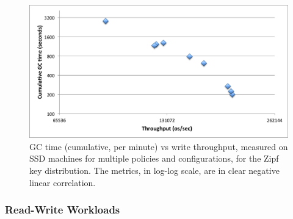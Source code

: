 \begin{figure}[htb]
\includegraphics[width=\figw]{Figs/gc-throughput-log2.png}
\caption{GC time (cumulative, per minute) vs write throughput, measured on SSD machines 
for multiple \sys\/ policies and configurations, for the Zipf  key distribution. The metrics, in log-log scale, 
are in clear negative linear correlation. 
}
\label{fig:gc-throughput-log2}
\end{figure}

\subsubsection{Read-Write Workloads}

